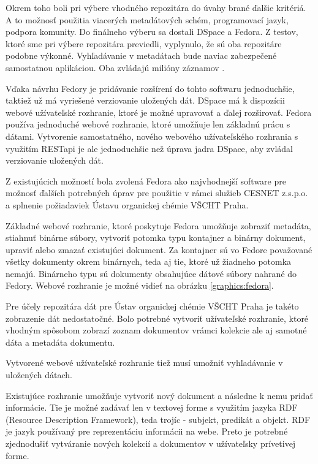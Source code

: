 \documentclass[thesis=M,slovak]{FITthesis}[2013/05/06]
\begin{document}
Okrem toho boli pri výbere vhodného repozitára do úvahy brané ďalšie kritériá. A to možnosť použitia viacerých metadátových schém, programovací jazyk, podpora komunity. Do finálneho výberu sa dostali DSpace a Fedora. Z testov, ktoré sme pri výbere repozitára previedli, vyplynulo, že sú oba repozitáre podobne výkonné. Vyhľadávanie v metadátach bude naviac zabezpečené samostatnou aplikáciou. Oba zvládajú milióny záznamov \cite{Fedora} \cite[s.~213]{DigitalLibrary}.

Vďaka návrhu Fedory je pridávanie rozšírení do tohto softwaru jednoduchšie, taktiež už má vyriešené verziovanie uložených dát. DSpace má k dispozícii webové užívateľské rozhranie, ktoré je možné upravovať a ďalej rozširovať. Fedora používa jednoduché webové rozhranie, ktoré umožňuje len základnú prácu s dátami. Vytvorenie samostatného, nového webového užívateľského rozhrania s využitím RESTapi je ale jednoduchšie než úprava jadra DSpace, aby zvládal verziovanie uložených dát.

Z existujúcich možností bola zvolená Fedora ako najvhodnejší software pre možnosť ďalších potrebných úprav pre použitie v rámci služieb CESNET z.s.p.o. a splnenie požiadaviek Ústavu organickej chémie VŠCHT Praha.

Základné webové rozhranie, ktoré poskytuje Fedora umožňuje zobraziť metadáta, stiahnuť binárne súbory, vytvoriť potomka typu kontajner a binárny dokument, upraviť alebo zmazať existujúci dokument. Za kontajner sú vo Fedore považované všetky dokumenty okrem binárnych, teda aj tie, ktoré už žiadneho potomka nemajú. Binárneho typu sú dokumenty obsahujúce dátové súbory nahrané do Fedory. Webové rozhranie je možné vidieť na obrázku \ref{graphics:fedora}.

Pre účely repozitára dát pre Ústav organickej chémie VŠCHT Praha je takéto zobrazenie dát nedostatočné. Bolo potrebné vytvoriť užívateľské rozhranie, ktoré vhodným spôsobom zobrazí zoznam dokumentov vrámci kolekcie ale aj samotné dáta a metadáta dokumentu.

Vytvorené webové užívateľské rozhranie tiež musí umožniť vyhľadávanie v uložených dátach.

Existujúce rozhranie umožňuje vytvoriť nový dokument a následne k nemu pridať informácie. Tie je možné zadávať len v textovej forme s využitím jazyka RDF (Resource Description Framework), teda trojíc - subjekt, predikát a objekt. RDF je jazyk používaný pre reprezentáciu informácii na webe. \cite{RDF} Preto je potrebné zjednodušiť vytváranie nových kolekcií a dokumentov v užívateľsky prívetivej forme.
\end{document}
